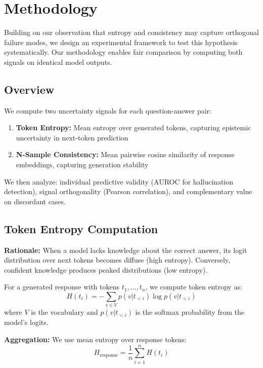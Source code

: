 \section{Methodology}
\label{sec:methodology}

Building on our observation that entropy and consistency may capture orthogonal failure modes, we design an experimental framework to test this hypothesis systematically. Our methodology enables fair comparison by computing both signals on identical model outputs.

\subsection{Overview}

We compute two uncertainty signals for each question-answer pair:

\begin{enumerate}
    \item \textbf{Token Entropy:} Mean entropy over generated tokens, capturing epistemic uncertainty in next-token prediction
    \item \textbf{N-Sample Consistency:} Mean pairwise cosine similarity of response embeddings, capturing generation stability
\end{enumerate}

We then analyze: individual predictive validity (AUROC for hallucination detection), signal orthogonality (Pearson correlation), and complementary value on discordant cases.

\subsection{Token Entropy Computation}

\textbf{Rationale:} When a model lacks knowledge about the correct answer, its logit distribution over next tokens becomes diffuse (high entropy). Conversely, confident knowledge produces peaked distributions (low entropy).

For a generated response with tokens $t_1, \ldots, t_n$, we compute token entropy as:
\begin{equation}
H(t_i) = -\sum_{v \in V} p(v | t_{<i}) \log p(v | t_{<i})
\end{equation}
where $V$ is the vocabulary and $p(v | t_{<i})$ is the softmax probability from the model's logits.

\textbf{Aggregation:} We use mean entropy over response tokens:
\begin{equation}
H_{\text{response}} = \frac{1}{n} \sum_{i=1}^{n} H(t_i)
\end{equation}

